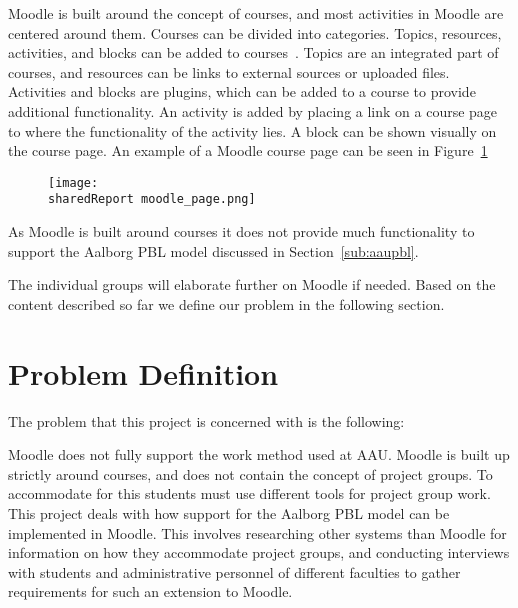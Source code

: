 Moodle is built around the concept of courses, and most activities in Moodle are centered around them.
Courses can be divided into categories.
Topics, resources, activities, and blocks can be added to courses~\citep{moodleStructural}.
Topics are an integrated part of courses, and resources can be links to external sources or uploaded files.
Activities and blocks are plugins, which can be added to a course to provide additional functionality.
An activity is added by placing a link on a course page to where the functionality of the activity lies.
A block can be shown visually on the course page.
An example of a Moodle course page can be seen in Figure~\ref{fig:MoodleCourse}

\begin{figure}
\texttt{[image: \\sharedReport moodle\_page.png]}
\label{fig:MoodleCourse}
\end{figure}

As Moodle is built around courses it does not provide much functionality to support the Aalborg PBL model discussed in Section~\ref{sub:aaupbl}.

The individual groups will elaborate further on Moodle if needed.
Based on the content described so far we define our problem in the following section.

\section{Problem Definition}
\label{sec:problemDef}
The problem that this project is concerned with is the following:

Moodle does not fully support the work method used at AAU.
Moodle is built up strictly around courses, and does not contain the concept of project groups.
To accommodate for this students must use different tools for project group work.
This project deals with how support for the Aalborg PBL model can be implemented in Moodle.
This involves researching other systems than Moodle for information on how they accommodate project groups, and conducting interviews with students and administrative personnel of different faculties to gather requirements for such an extension to Moodle.